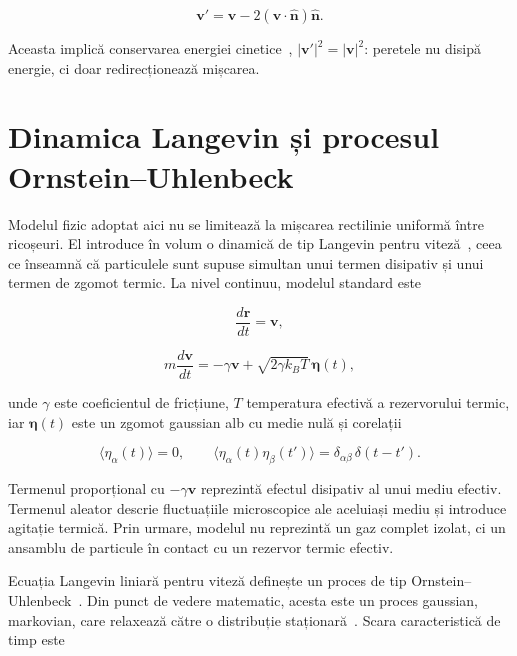 \documentclass[12pt,openright,twoside]{book}
\begin{document}
\begin{equation}
    \mathbf{v}'=\mathbf{v}-2(\mathbf{v}\cdot\hat{\mathbf{n}})\hat{\mathbf{n}}.
    \label{eq:specular_reflection}
\end{equation}

Aceasta implică conservarea energiei cinetice~\cite{cercignani1988,kogan1969}, $|\mathbf{v}'|^2=|\mathbf{v}|^2$: peretele nu disipă energie, ci doar redirecționează mișcarea.

\section{Dinamica Langevin și procesul Ornstein--Uhlenbeck}

Modelul fizic adoptat aici nu se limitează la mișcarea rectilinie uniformă între ricoșeuri. El introduce în volum o dinamică de tip Langevin pentru viteză~\cite{langevin1908,einstein1905,lemons1997}, ceea ce înseamnă că particulele sunt supuse simultan unui termen disipativ și unui termen de zgomot termic. La nivel continuu, modelul standard este

\begin{equation}
    \frac{d\mathbf{r}}{dt}=\mathbf{v},
\end{equation}

\begin{equation}
    m\frac{d\mathbf{v}}{dt}=-\gamma\mathbf{v}+\sqrt{2\gamma k_B T}\,\boldsymbol{\eta}(t),
    \label{eq:langevin_velocity}
\end{equation}

unde $\gamma$ este coeficientul de fricțiune, $T$ temperatura efectivă a rezervorului termic, iar $\boldsymbol{\eta}(t)$ este un zgomot gaussian alb cu medie nulă și corelații

\begin{equation}
    \langle \eta_\alpha(t) \rangle = 0,
    \qquad
    \langle \eta_\alpha(t)\eta_\beta(t') \rangle = \delta_{\alpha\beta}\,\delta(t-t').
\end{equation}

Termenul proporțional cu $-\gamma\mathbf{v}$ reprezintă efectul disipativ al unui mediu efectiv. Termenul aleator descrie fluctuațiile microscopice ale aceluiași mediu și introduce agitație termică. Prin urmare, modelul nu reprezintă un gaz complet izolat, ci un ansamblu de particule în contact cu un rezervor termic efectiv.

Ecuația Langevin liniară pentru viteză definește un proces de tip Ornstein--Uhlenbeck~\cite{uhlenbeck1930}. Din punct de vedere matematic, acesta este un proces gaussian, markovian, care relaxează către o distribuție staționară~\cite{vankampen2007,risken1989}. Scara caracteristică de timp este
\end{document}
